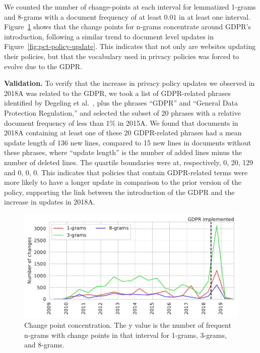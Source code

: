 We counted the number of change-points at each interval for lemmatized 1-grams and 8-grams with a document frequency of at least $0.01$ in at least one interval.
Figure~\ref{fig:changepoints} shows that the change points for n-grams concentrate around GDPR's introduction, following a similar trend to document level updates in Figure~\ref{fig:pct-policy-update}. This indicates that not only are websites updating their policies, but that the vocabulary used in privacy policies was forced to evolve due to the GDPR.


\textbf{Validation.} To verify that the increase in privacy policy updates we observed in 2018A was related to the GDPR, we took a list of GDPR-related phrases identified by Degeling et al.~\cite{degeling2018we}, plus the phrases “GDPR” and “General Data Protection Regulation,” and selected the subset of 20 phrases with a relative document frequency of less than 1\% in 2015A. We found that documents in 2018A containing at least one of these 20 GDPR-related phrases had a mean update length of 136 new lines, compared to 15 new lines in documents without these phrases, where “update length” is the number of added lines minus the number of deleted lines. The quartile boundaries were at, respectively, 0, 20, 129 and 0, 0, 0. This indicates that policies that contain GDPR-related terms were more likely to have a longer update in comparison to the prior version of the policy, supporting the link between the introduction of the GDPR and the increase in updates in 2018A.

\begin{figure}
    \centering
    \includegraphics[width=.9\textwidth]{chapters/privacypolicies/figures/changepoints.pdf}
    \caption{Change point concentration. The y value is the number of frequent n-grams with change points in that interval for 1-grams, 3-grams, and 8-grams.}
    
    \label{fig:changepoints}
\end{figure}
